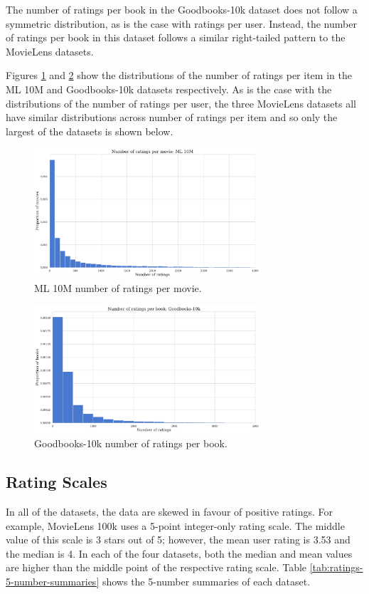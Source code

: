 The number of ratings per book in the Goodbooks-10k dataset does not follow a symmetric distribution, as is the case with ratings per user. Instead, the number of ratings per book in this dataset follows a similar right-tailed pattern to the MovieLens datasets.

Figures \ref{fig:ML10M-items} and \ref{fig:goodbooks-items} show the distributions of the number of ratings per item in the ML 10M and Goodbooks-10k datasets respectively. As is the case with the distributions of the number of ratings per user, the three MovieLens datasets all have similar distributions across number of ratings per item and so only the largest of the datasets is shown below.

\begin{figure}[H]
\centering
\includegraphics[width=0.75\textwidth]{Figures/3_ratings-distributions/ml_10m_movie-ratings.pdf}
\caption{ML 10M number of ratings per movie.}
\label{fig:ML10M-items}
\end{figure}

\begin{figure}[H]
\centering
\includegraphics[width=0.75\textwidth]{Figures/3_ratings-distributions/goodbooks-ratings.pdf}
\caption{Goodbooks-10k number of ratings per book.}
\label{fig:goodbooks-items}
\end{figure}

\subsection{Rating Scales}
In all of the datasets, the data are skewed in favour of positive ratings. For example, MovieLens 100k uses a 5-point integer-only rating scale. The middle value of this scale is 3 stars out of 5; however, the mean user rating is 3.53 and the median is 4. In each of the four datasets, both the median and mean values are higher than the middle point of the respective rating scale. Table \ref{tab:ratings-5-number-summaries} shows the 5-number summaries of each dataset.

